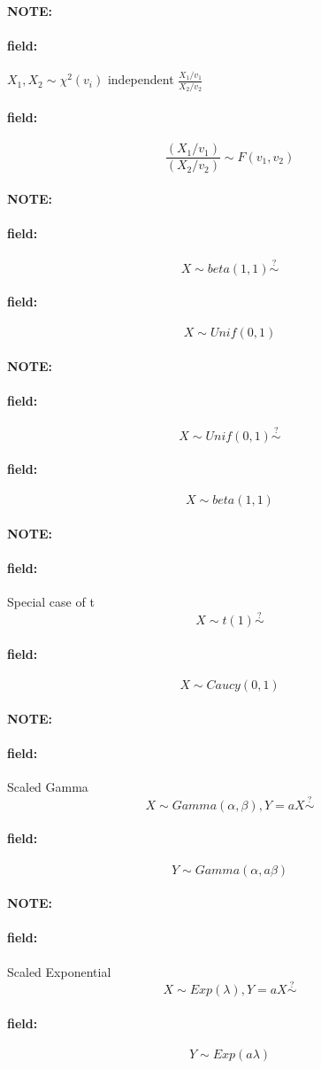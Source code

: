 \documentclass[12pt]{article}
\newenvironment{note}{\paragraph{NOTE:}}{}
\newenvironment{field}{\paragraph{field:}}{}
\begin{document}
\begin{note}
  \begin{field}
    $X_1, X_2 \sim \chi^2(v_i)$ independent
    $ \frac{X_1/v_1}{X_2/v_2}$
  \end{field}
  \begin{field}
    $$ \frac{(X_1/v_1)}{(X_2/v_2)} \sim F(v_1,v_2)$$
  \end{field}
\end{note}



\begin{note}
  \begin{field}
    $$ X \sim beta(1,1) \overset{?}{\sim}$$
  \end{field}
  \begin{field}
    $$ X \sim Unif(0,1)$$
  \end{field}
\end{note}

\begin{note}
  \begin{field}
    $$ X \sim Unif(0,1) \overset{?}{\sim}$$
  \end{field}
  \begin{field}
    $$ X \sim beta(1,1)$$
  \end{field}
\end{note}

\begin{note}
  \begin{field}
    Special case of t
    $$ X \sim t(1) \overset{?}{\sim}$$
  \end{field}
  \begin{field}
    $$ X \sim Caucy(0,1)$$
  \end{field}
\end{note}


\begin{note}
  \begin{field}
    Scaled Gamma
    $$X \sim Gamma(\alpha,\beta), Y = aX \overset{?}{\sim}$$
  \end{field}
  \begin{field}
    $$ Y \sim Gamma(\alpha,a\beta)$$
  \end{field}
\end{note}

\begin{note}
  \begin{field}
    Scaled Exponential
    $$ X \sim Exp(\lambda), Y = aX \overset{?}{\sim}$$
  \end{field}
  \begin{field}
    $$ Y \sim Exp(a\lambda)$$
  \end{field}
\end{note}
\end{document}
